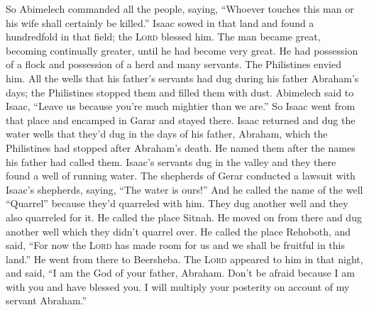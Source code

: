 \begin{inparaenum}
   So Abimelech commanded all the people, saying, ``Whoever touches this man or his wife shall certainly be killed.''%
   Isaac sowed in that land and found a hundredfold in that field; the \textsc{Lord} blessed him.%
   The man became great, becoming continually greater, until he had become very great.%
   He had possession of a flock and possession of a herd and many servants. The Philistines envied him.%
   All the wells that his father's servants had dug during his father Abraham's days; the Philistines stopped them and filled them with dust.%
   Abimelech said to Isaac, ``Leave us because you're much mightier than we are.''%
   So Isaac went from that place and encamped in Garar and stayed there.%
   Isaac returned and dug the water wells that they'd dug in the days of his father, Abraham, which the Philistines had stopped after Abraham's death. He named them after the names his father had called them.%
   Isaac's servants dug in the valley and they there found a well of running water.%
   The shepherds of Gerar conducted a lawsuit with Isaac's shepherds, saying, ``The water is ours!'' And he called the name of the well ``Quarrel'' because they'd quarreled with him.%
   They dug another well and they also quarreled for it. He called the place Sitnah.%
   He moved on from there and dug another well which they didn't quarrel over. He called the place Rehoboth, and said, ``For now the \textsc{Lord} has made room for us and we shall be fruitful in this land.''%
   He went from there to Beersheba.%
   The \textsc{Lord} appeared to him in that night, and said, ``I am the God of your father, Abraham. Don't be afraid because I am with you and have blessed you. I will multiply your posterity on account of my servant Abraham.''%

\end{inparaenum}
